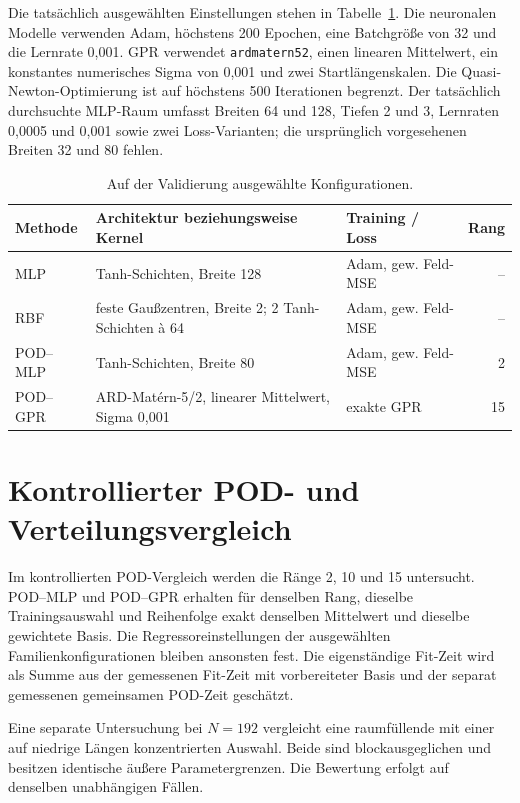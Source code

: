 Die tatsächlich ausgewählten Einstellungen stehen in Tabelle~\ref{tab:config}. Die neuronalen Modelle verwenden Adam, höchstens 200 Epochen, eine Batchgröße von 32 und die Lernrate 0,001. GPR verwendet \texttt{ardmatern52}, einen linearen Mittelwert, ein konstantes numerisches Sigma von 0,001 und zwei Startlängenskalen. Die Quasi-Newton-Optimierung ist auf höchstens 500 Iterationen begrenzt. Der tatsächlich durchsuchte MLP-Raum umfasst Breiten 64 und 128, Tiefen 2 und 3, Lernraten 0,0005 und 0,001 sowie zwei Loss-Varianten; die ursprünglich vorgesehenen Breiten 32 und 80 fehlen.
\begin{table}[htbp]\centering\caption{Auf der Validierung ausgewählte Konfigurationen.}\label{tab:config}
\small\begin{tabular}{>{\raggedright\arraybackslash}p{25mm}>{\raggedright\arraybackslash}p{73mm}>{\raggedright\arraybackslash}p{30mm}r}\toprule Methode & Architektur beziehungsweise Kernel & Training / Loss & Rang\\\midrule
MLP & 3 Tanh-Schichten, Breite 128 & Adam, gew. Feld-MSE & --\\
RBF & 64 feste Gaußzentren, Breite 2; 2 Tanh-Schichten à 64 & Adam, gew. Feld-MSE & --\\
POD--MLP & 3 Tanh-Schichten, Breite 80 & Adam, gew. Feld-MSE & 2\\
POD--GPR & ARD-Matérn-5/2, linearer Mittelwert, Sigma 0,001 & exakte GPR & 15\\\bottomrule\end{tabular}\end{table}

\section{Kontrollierter POD- und Verteilungsvergleich}
Im kontrollierten POD-Vergleich werden die Ränge 2, 10 und 15 untersucht. POD--MLP und POD--GPR erhalten für denselben Rang, dieselbe Trainingsauswahl und Reihenfolge exakt denselben Mittelwert und dieselbe gewichtete Basis. Die Regressoreinstellungen der ausgewählten Familienkonfigurationen bleiben ansonsten fest. Die eigenständige Fit-Zeit wird als Summe aus der gemessenen Fit-Zeit mit vorbereiteter Basis und der separat gemessenen gemeinsamen POD-Zeit geschätzt.

Eine separate Untersuchung bei $N=192$ vergleicht eine raumfüllende mit einer auf niedrige Längen konzentrierten Auswahl. Beide sind blockausgeglichen und besitzen identische äußere Parametergrenzen. Die Bewertung erfolgt auf denselben unabhängigen Fällen.

